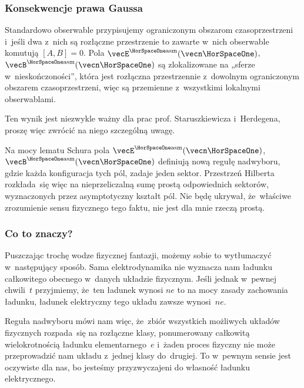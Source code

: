 \documentclass[10pt,t]{beamer}
\begin{document}
\begin{frame}
  \frametitle{Konsekwencje prawa Gaussa}


  Standardowo obserwable przypisujemy ograniczonym obszarom
  czasoprzestrzeni i~jeśli dwa z~nich są rozłączne przestrzenie to zawarte
  w~nich obserwable komutują $[ A, B ] = 0$. Pola $\vecEasm$,
  $\vecBasm$ są zlokalizowane na „sferze w~nieskończoności”, która jest
  rozłączna przestrzennie z~dowolnym ograniczonym obszarem
  czasoprzestrzeni, więc są przemienne z~wszystkimi lokalnymi obserwablami.

  Ten wynik jest niezwykle ważny dla prac prof. Staruszkiewicza i~Herdegena,
  proszę więc zwrócić na niego szczególną uwagę.

  Na mocy lematu Schura pola $\vecEasm$, $\vecBasm$ definiują nową regułę
  nadwyboru, gdzie każda konfiguracja tych pól, zadaje jeden sektor.
  Przestrzeń Hilberta rozkłada~się więc na \alert{nieprzeliczalną} sumę
  prostą odpowiednich sektorów, wyznaczonych przez asymptotyczny kształt
  pól. Nie będę ukrywał, że~właściwe zrozumienie sensu fizycznego tego
  faktu, nie jest dla mnie rzeczą prostą.

\end{frame}





\begin{frame}
  \frametitle{Co to znaczy?}


  Puszczając trochę wodze fizycznej fantazji, możemy sobie to wytłumaczyć
  w~następujący sposób. Sama elektrodynamika nie wyznacza nam ładunku
  całkowitego obecnego w~danych układzie fizycznym. Jeśli jednak w~pewnej
  chwili~$t$ przyjmiemy, że~ten ładunek wynosi $n e$ to na mocy zasady
  zachowania ładunku, ładunek elektryczny tego układu \alert{zawsze}
  wynosi~$n e$.

  Reguła nadwyboru mówi nam więc, że~zbiór wszystkich możliwych układów
  fizycznych rozpada~się na rozłączne klasy, ponumerowany całkowitą
  wielokrotnością ładunku elementarnego~$e$ i~\alert{żaden} proces fizyczny
  nie może przeprowadzić nam układu z~jednej klasy do~drugiej. To w~pewnym
  sensie jest oczywiste dla nas, bo jesteśmy przyzwyczajeni do własność
  ładunku elektrycznego.


\end{frame}
\end{document}
